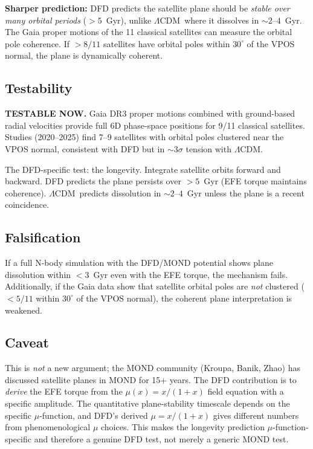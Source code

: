 \documentclass[11pt]{article}
\newcommand{\LCDM}{$\Lambda$CDM}
\begin{document}
\textbf{Sharper prediction:} DFD predicts the satellite plane should be
\emph{stable over many orbital periods} ($> 5$~Gyr), unlike \LCDM\ where
it dissolves in $\sim 2$--$4$~Gyr.  The Gaia proper motions of the 11
classical satellites can measure the orbital pole coherence.  If $> 8/11$
satellites have orbital poles within $30^\circ$ of the VPOS normal, the
plane is dynamically coherent.

\subsection{Testability}

\textbf{TESTABLE NOW.}  Gaia DR3 proper motions combined with
ground-based radial velocities provide full 6D phase-space positions
for 9/11 classical satellites.  Studies (2020--2025) find 7--9 satellites
with orbital poles clustered near the VPOS normal, consistent with DFD
but in $\sim 3\sigma$ tension with \LCDM.

The DFD-specific test: the longevity.  Integrate satellite orbits forward
and backward.  DFD predicts the plane persists over $> 5$~Gyr (EFE
torque maintains coherence).  \LCDM\ predicts dissolution in
$\sim 2$--$4$~Gyr unless the plane is a recent coincidence.

\subsection{Falsification}

If a full N-body simulation with the DFD/MOND potential shows plane
dissolution within $< 3$~Gyr even with the EFE torque, the mechanism
fails.  Additionally, if the Gaia data show that satellite orbital poles
are \emph{not} clustered ($< 5/11$ within $30^\circ$ of the VPOS normal),
the coherent plane interpretation is weakened.

\subsection{Caveat}

This is \emph{not} a new argument; the MOND community (Kroupa, Banik,
Zhao) has discussed satellite planes in MOND for 15+ years.  The DFD
contribution is to \emph{derive} the EFE torque from the $\mu(x) = x/(1+x)$
field equation with a specific amplitude.  The quantitative plane-stability
timescale depends on the specific $\mu$-function, and DFD's derived
$\mu = x/(1+x)$ gives different numbers from phenomenological $\mu$
choices.  This makes the longevity prediction $\mu$-function-specific and
therefore a genuine DFD test, not merely a generic MOND test.
\end{document}
